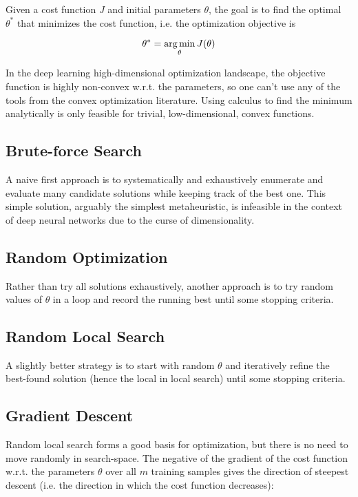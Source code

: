 Given a cost function $J$ and initial parameters $\theta$, the goal is to find the optimal $\theta^*$ that minimizes the cost function, i.e. the optimization objective is

$$
\theta^{*} = \operatorname*{arg\,min}_{\theta} J(\theta)
$$

In the deep learning high-dimensional optimization landscape, the objective function is highly non-convex w.r.t. the parameters, so one can't use any of the tools from the convex optimization literature. Using calculus to find the minimum analytically is only feasible for trivial, low-dimensional, convex functions.

\subsection{Brute-force Search}

A naive first approach is to systematically and exhaustively enumerate and evaluate many candidate solutions while keeping track of the best one. This simple solution, arguably the simplest metaheuristic, is infeasible in the context of deep neural networks due to the curse of dimensionality.

\subsection{Random Optimization}

Rather than try all solutions exhaustively, another approach is to try random values of $\theta$ in a loop and record the running best until some stopping criteria.

\subsection{Random Local Search}

A slightly better strategy is to start with random $\theta$ and iteratively refine the best-found solution (hence the local in local search) until some stopping criteria.

\subsection{Gradient Descent}

Random local search forms a good basis for optimization, but there is no need to move randomly in search-space. The negative of the gradient of the cost function w.r.t. the parameters $\theta$ over all $m$ training samples gives the direction of steepest descent (i.e. the direction in which the cost function decreases):

